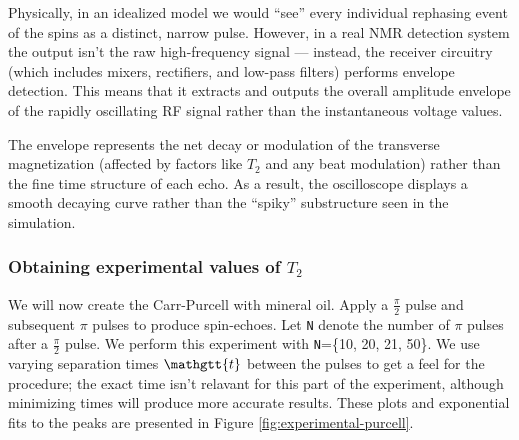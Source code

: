 \documentclass[%
 reprint,
 amsmath,amssymb,
 aps,
]{revtex4-2}
\newcommand{\halfpi}{\frac{\pi}{2}}
\newcommand{\taucode}{\mathgtt{t}}
\begin{document}
Physically, in an idealized model we would ``see'' every individual rephasing event of the spins as a distinct, narrow pulse. However, in a real NMR detection system the output isn't the raw high-frequency signal — instead, the receiver circuitry (which includes mixers, rectifiers, and low-pass filters) performs envelope detection. This means that it extracts and outputs the overall amplitude envelope of the rapidly oscillating RF signal rather than the instantaneous voltage values.

The envelope represents the net decay or modulation of the transverse magnetization (affected by factors like $T_2$ and any beat modulation) rather than the fine time structure of each echo. As a result, the oscilloscope displays a smooth decaying curve rather than the ``spiky'' substructure seen in the simulation.

\subsubsection{Obtaining experimental values of $T_2$}

We will now create the Carr-Purcell with mineral oil. Apply a $\halfpi$ pulse and subsequent $\pi$ pulses to produce spin-echoes. Let \texttt{N} denote the number of $\pi$ pulses after a $\halfpi$ pulse. We perform this experiment with \texttt{N}=\{10, 20, 21, 50\}. We use varying separation times $\taucode$ between the pulses to get a feel for the procedure; the exact time isn't relavant for this part of the experiment, although minimizing times will produce more accurate results. These plots and exponential fits to the peaks are presented in Figure \ref{fig:experimental-purcell}. 
\end{document}
